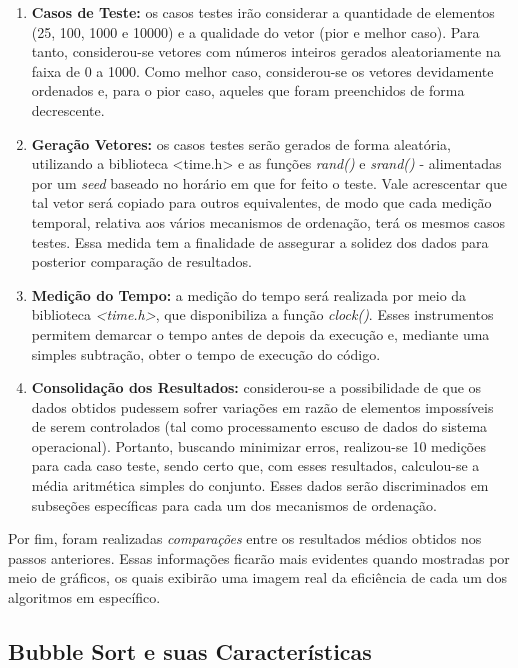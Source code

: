 \documentclass[a4paper, 12pt]{article}
\begin{document}
\begin{enumerate}
    \item \textbf{Casos de Teste:} os casos testes irão considerar a quantidade de elementos (25, 100, 1000 e 10000) e a qualidade do vetor (pior e melhor caso). Para tanto, considerou-se vetores com números inteiros gerados aleatoriamente na faixa de 0 a 1000. Como melhor caso, considerou-se os vetores devidamente ordenados e, para o pior caso, aqueles que foram preenchidos de forma decrescente.
    \item \textbf{Geração Vetores:} os casos testes serão gerados de forma aleatória, utilizando a biblioteca <time.h> e as funções \textit{rand()} e \textit{srand()} - alimentadas por um \textit{seed} baseado no horário em que for feito o teste. Vale acrescentar que tal vetor será copiado para outros equivalentes, de modo que cada medição temporal, relativa aos vários mecanismos de ordenação, terá os mesmos casos testes. Essa medida tem a finalidade de assegurar a solidez dos dados para posterior comparação de resultados.
    \item \textbf{Medição do Tempo:} a medição do tempo será realizada por meio da biblioteca \textit{<time.h>}, que disponibiliza a função \textit{clock()}. Esses instrumentos permitem demarcar o tempo antes de depois da execução e, mediante uma simples subtração, obter o tempo de execução do código. 
    \item \textbf{Consolidação dos Resultados:} considerou-se a possibilidade de que os dados obtidos pudessem sofrer variações em razão de elementos impossíveis de serem controlados (tal como processamento escuso de dados do sistema operacional). Portanto, buscando minimizar erros, realizou-se 10 medições para cada caso teste, sendo certo que, com esses resultados, calculou-se a média aritmética simples do conjunto. Esses dados serão discriminados em subseções específicas para cada um dos mecanismos de ordenação.
\end{enumerate}

Por fim, foram realizadas \textit{comparações} entre os resultados médios obtidos nos passos anteriores. Essas informações ficarão mais evidentes quando mostradas por meio de gráficos, os quais exibirão uma imagem real da eficiência de cada um dos algoritmos em específico.


\subsection{Bubble Sort e suas Características}
\end{document}
